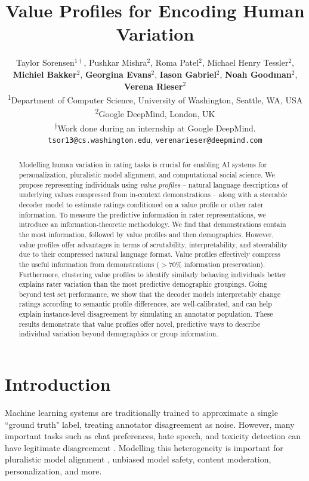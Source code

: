\documentclass[11pt]{article}
\title{Value Profiles for Encoding Human Variation}
\author{Taylor Sorensen$^{1\dagger}$, Pushkar Mishra$^2$, Roma Patel$^2$, Michael Henry Tessler$^2$, \\
\textbf{Michiel Bakker}$^2$, \textbf{Georgina Evans}$^2$, \textbf{Iason Gabriel}$^2$, \textbf{Noah Goodman}$^2$, \textbf{Verena Rieser}$^2$
\\ \textsuperscript{1}Department of Computer Science, University of Washington, Seattle, WA, USA
\\ \textsuperscript{2}Google DeepMind, London, UK
\\ \textsuperscript{$\dagger$}Work done during an internship at Google DeepMind.
\\ \texttt{tsor13@cs.washington.edu}, \texttt{verenarieser@deepmind.com}
}
\begin{document}

\maketitle

\begin{abstract}
Modelling human variation in rating tasks is crucial for enabling AI systems for personalization, pluralistic model alignment, and computational social science. We propose representing individuals using {\em value profiles} -- natural language descriptions of underlying values compressed from in-context demonstrations -- along with a steerable decoder model to estimate ratings conditioned on a value profile or other rater information. To measure the predictive information in rater representations, we introduce an information-theoretic methodology. We find that demonstrations contain the most information, followed by value profiles and then demographics. However, value profiles offer advantages in terms of scrutability, interpretability, and steerability due to their compressed natural language format. Value profiles effectively compress the useful information from demonstrations ($>$70\% information preservation). Furthermore, clustering value profiles to identify similarly behaving individuals better explains rater variation than the most predictive demographic groupings. Going beyond test set performance, we show that the decoder models interpretably change ratings according to semantic profile differences, are well-calibrated, and can help explain instance-level disagreement by simulating an annotator population. These results demonstrate that value profiles offer novel, predictive ways to describe individual variation beyond demographics or group information.
\end{abstract}

\section{Introduction}
\label{sec:introduction}
Machine learning systems are traditionally trained to approximate a single ``ground truth" label, treating annotator disagreement as noise. However, many important tasks such as chat preferences, hate speech, and toxicity detection can have legitimate disagreement \citep{Aroyo_Welty_2015, plank-2022-problem}. Modelling this heterogeneity is important for pluralistic model alignment \citep{sorensen2024roadmappluralisticalignment}, unbiased model safety, content moderation, personalization, and more. 
\end{document}
